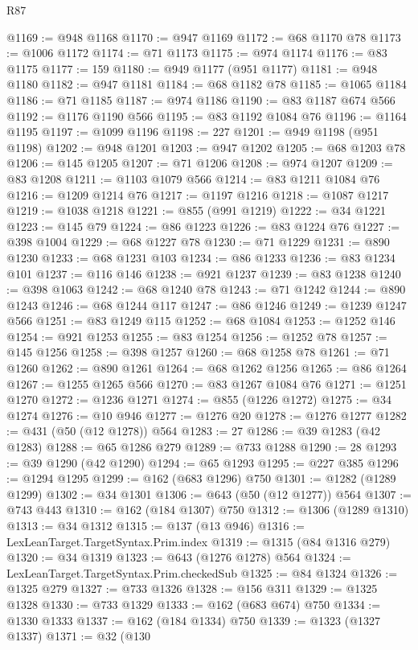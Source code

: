 \begin{lexlean}{R87}
\begin{coremodule}
{{@1169 := @948 @1168
@1170 := @947 @1169
@1172 := @68 @1170 @78
@1173 := @1006 @1172
@1174 := @71 @1173
@1175 := @974 @1174
@1176 := @83 @1175
@1177 := 159
@1180 := @949 @1177 (@951 @1177)
@1181 := @948 @1180
@1182 := @947 @1181
@1184 := @68 @1182 @78
@1185 := @1065 @1184
@1186 := @71 @1185
@1187 := @974 @1186
@1190 := @83 @1187 @674 @566
@1192 := @1176 @1190 @566
@1195 := @83 @1192 @1084 @76
@1196 := @1164 @1195
@1197 := @1099 @1196
@1198 := 227
@1201 := @949 @1198 (@951 @1198)
@1202 := @948 @1201
@1203 := @947 @1202
@1205 := @68 @1203 @78
@1206 := @145 @1205
@1207 := @71 @1206
@1208 := @974 @1207
@1209 := @83 @1208
@1211 := @1103 @1079 @566
@1214 := @83 @1211 @1084 @76
@1216 := @1209 @1214 @76
@1217 := @1197 @1216
@1218 := @1087 @1217
@1219 := @1038 @1218
@1221 := @855 (@991 @1219)
@1222 := @34 @1221
@1223 := @145 @79
@1224 := @86 @1223
@1226 := @83 @1224 @76
@1227 := @398 @1004
@1229 := @68 @1227 @78
@1230 := @71 @1229
@1231 := @890 @1230
@1233 := @68 @1231 @103
@1234 := @86 @1233
@1236 := @83 @1234 @101
@1237 := @116 @146
@1238 := @921 @1237
@1239 := @83 @1238
@1240 := @398 @1063
@1242 := @68 @1240 @78
@1243 := @71 @1242
@1244 := @890 @1243
@1246 := @68 @1244 @117
@1247 := @86 @1246
@1249 := @1239 @1247 @566
@1251 := @83 @1249 @115
@1252 := @68 @1084
@1253 := @1252 @146
@1254 := @921 @1253
@1255 := @83 @1254
@1256 := @1252 @78
@1257 := @145 @1256
@1258 := @398 @1257
@1260 := @68 @1258 @78
@1261 := @71 @1260
@1262 := @890 @1261
@1264 := @68 @1262 @1256
@1265 := @86 @1264
@1267 := @1255 @1265 @566
@1270 := @83 @1267 @1084 @76
@1271 := @1251 @1270
@1272 := @1236 @1271
@1274 := @855 (@1226 @1272)
@1275 := @34 @1274
@1276 := @10 @946
@1277 := @1276 @20
@1278 := @1276 @1277
@1282 := @431 (@50 (@12 @1278)) @564
@1283 := 27
@1286 := @39 @1283 (@42 @1283)
@1288 := @65 @1286 @279
@1289 := @733 @1288
@1290 := 28
@1293 := @39 @1290 (@42 @1290)
@1294 := @65 @1293
@1295 := @227 @385
@1296 := @1294 @1295
@1299 := @162 (@683 @1296) @750
@1301 := @1282 (@1289 @1299)
@1302 := @34 @1301
@1306 := @643 (@50 (@12 @1277)) @564
@1307 := @743 @443
@1310 := @162 (@184 @1307) @750
@1312 := @1306 (@1289 @1310)
@1313 := @34 @1312
@1315 := @137 (@13 @946)
@1316 := LexLeanTarget.TargetSyntax.Prim.index
@1319 := @1315 (@84 @1316 @279)
@1320 := @34 @1319
@1323 := @643 (@1276 @1278) @564
@1324 := LexLeanTarget.TargetSyntax.Prim.checkedSub
@1325 := @84 @1324
@1326 := @1325 @279
@1327 := @733 @1326
@1328 := @156 @311
@1329 := @1325 @1328
@1330 := @733 @1329
@1333 := @162 (@683 @674) @750
@1334 := @1330 @1333
@1337 := @162 (@184 @1334) @750
@1339 := @1323 (@1327 @1337)
@1371 := @32
    (@130
}}
\end{coremodule}
\end{lexlean}
